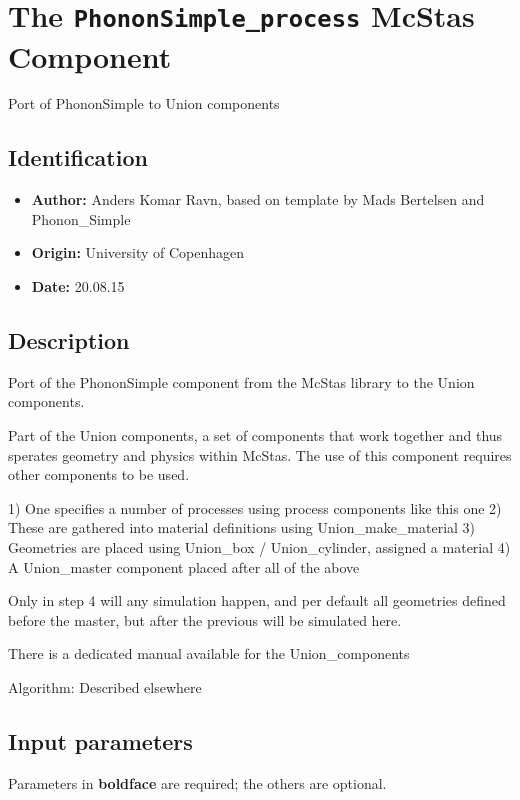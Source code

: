 \section{The \texttt{PhononSimple\_process} McStas Component}
Port of PhononSimple to Union components

\subsection*{Identification}
\begin{itemize}
  \item \textbf{Author:} Anders Komar Ravn, based on template by Mads Bertelsen and Phonon\_Simple
  \item \textbf{Origin:} University of Copenhagen
  \item \textbf{Date:} 20.08.15
\end{itemize}

\subsection*{Description}
Port of the PhononSimple component from the McStas library to the Union components.

Part of the Union components, a set of components that work together and thus sperates geometry and physics within McStas. The use of this component requires other components to be used.

1) One specifies a number of processes using process components like this one 2) These are gathered into material definitions using Union\_make\_material 3) Geometries are placed using Union\_box / Union\_cylinder, assigned a material 4) A Union\_master component placed after all of the above

Only in step 4 will any simulation happen, and per default all geometries defined before the master, but after the previous will be simulated here.

There is a dedicated manual available for the Union\_components

Algorithm: Described elsewhere

\subsection*{Input parameters}
Parameters in \textbf{boldface} are required; the others are optional.

